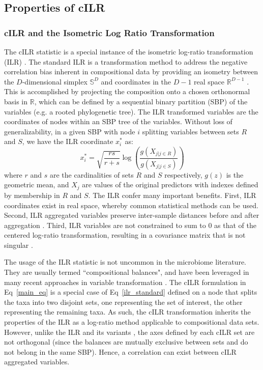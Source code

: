 \documentclass[10pt,letterpaper]{article}
\begin{document}
\subsection*{Properties of cILR}
\subsubsection*{cILR and the Isometric Log Ratio Transformation}
The cILR statistic is a special instance of the isometric log-ratio transformation (ILR) \cite{egozcue2003}. The standard ILR is a transformation method to address the negative correlation bias inherent in compositional data by providing an isometry between the $D$-dimensional simplex $\mathbb{S}^D$ and coordinates in the $D-1$ real space $\mathbb{R}^{D-1}$ \cite{egozcue2003,washburne2017}. This is accomplished by projecting the composition onto a chosen orthonormal basis in $\mathbb{R}$, which can be defined by a sequential binary partition (SBP) of the variables (e.g. a rooted phylogenetic tree). The ILR transformed variables are the coordinates of nodes within an SBP tree of the variables. Without loss of generalizability, in a given SBP with node $i$ splitting variables between sets $R$ and $S$, we have the ILR coordinate $x^{*}_{i}$ as: 
\begin{equation}\label{ilr_standard}
    x^{*}_i = \sqrt{\frac{rs}{r+s}} \log\left(\frac{g(X_{j|j \in R})}{g(X_{j|j \in S})}\right)
\end{equation}
where $r$ and $s$ are the cardinalities of sets $R$ and $S$ respectively, $g(z)$ is the geometric mean, and $X_{j}$ are values of the original predictors with indexes defined by membership in $R$ and $S$. The ILR confer many important benefits. First, ILR coordinates exist in real space, whereby common statistical methods can be used. Second, ILR aggregated variables preserve inter-sample distances before and after aggregation \cite{egozcue2005}. Third, ILR variables are not constrained to sum to 0 as that of the centered log-ratio transformation, resulting in a covariance matrix that is not singular \cite{egozcue2003}. 

The usage of the ILR statistic is not uncommon in the microbiome literature. They are usually termed ``compositional balances", and have been leveraged in many recent approaches in variable transformation \cite{washburne2017,silverman2017,morton2017}. The cILR formulation in Eq~\eqref{main_eq} is a special case of Eq~\eqref{ilr_standard} defined on a node that splits the taxa into two disjoint sets, one representing the set of interest, the other representing the remaining taxa. As such, the cILR transformation inherits the properties of the ILR as a log-ratio method applicable to compositional data sets. However, unlike the ILR and its variants \cite{silverman2017, morton2017, washburne2017}, the axes defined by each cILR set are not orthogonal (since the balances are mutually exclusive between sets and do not belong in the same SBP). Hence, a correlation can exist between cILR aggregated variables.  
\end{document}
